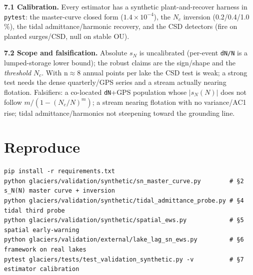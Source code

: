 \documentclass[tc, manuscript]{copernicus}
\begin{document}
\textbf{7.1 Calibration.} Every estimator has a synthetic plant-and-recover harness in \texttt{pytest}: the master-curve closed form ($1.4\times 10^{-4}$), the $N_{c}$ inversion (0.2/0.4/1.0 \%), the tidal admittance/harmonic recovery, and the CSD detectors (fire on planted surges/CSD, null on stable OU).

\textbf{7.2 Scope and falsification.} Absolute $s_{N}$ is uncalibrated (per-event \texttt{dN/\allowbreak{}N} is a lumped-storage lower bound); the robust claims are the sign/shape and the \emph{threshold} $N_{c}$. With n\ensuremath{\approx}8 annual points per lake the CSD test is weak; a strong test needs the dense quarterly/GPS series and a stream actually nearing flotation. Falsifiers: a co-located \texttt{dN}+GPS population whose $|s_{N}(N)|$ does not follow $m/(1-(N_{c}/N)^{m})$; a stream nearing flotation with no variance/AC1 rise; tidal admittance/harmonics not steepening toward the grounding line.

\section{Reproduce}

\begin{verbatim}
pip install -r requirements.txt
python glaciers/validation/synthetic/sn_master_curve.py        # §2 s_N(N) master curve + inversion
python glaciers/validation/synthetic/tidal_admittance_probe.py # §4 tidal third probe
python glaciers/validation/synthetic/spatial_ews.py            # §5 spatial early-warning
python glaciers/validation/external/lake_lag_sn_ews.py         # §6 framework on real lakes
pytest glaciers/tests/test_validation_synthetic.py -v          # §7 estimator calibration
\end{verbatim}

\end{document}
